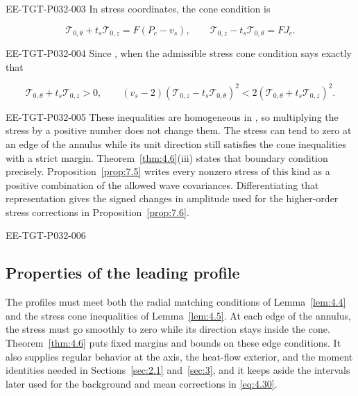 \begin{EESegment}{EE-TGT-P032-003}
In stress coordinates, the cone condition is
\end{EESegment}
\begin{equation}
  \mathcal{T}_{0,\theta}+t_s\mathcal{T}_{0,z}=F(P_c-v_s),\qquad
  \mathcal{T}_{0,z}-t_s\mathcal{T}_{0,\theta}=FJ_c.
  \tag{4.23}\label{eq:4.23}
\end{equation}
\begin{EESegment}{EE-TGT-P032-004}
Since , when
 the admissible stress cone condition says exactly
that
\end{EESegment}
\[
  \mathcal{T}_{0,\theta}+t_s\mathcal{T}_{0,z}>0,
  \qquad
  (v_s-2)(\mathcal{T}_{0,z}-t_s\mathcal{T}_{0,\theta})^2
  <2(\mathcal{T}_{0,\theta}+t_s\mathcal{T}_{0,z})^2.
\]
\begin{EESegment}{EE-TGT-P032-005}
These inequalities are homogeneous in
, so multiplying the stress by a positive
number does not change them. The stress can tend to zero at an edge of the
annulus while its unit direction still satisfies the cone inequalities with
a strict margin. Theorem~\ref{thm:4.6}(iii) states that boundary condition
precisely. Proposition~\ref{prop:7.5} writes every nonzero stress of this
kind as a positive combination of the allowed wave covariances.
Differentiating that representation gives the signed changes in amplitude
used for the higher-order stress corrections in
Proposition~\ref{prop:7.6}.
\end{EESegment}

\begin{EESegment}{EE-TGT-P032-006}
\subsection{Properties of the leading profile}\label{sec:4.4}

The profiles  must meet both the radial matching
conditions of Lemma~\ref{lem:4.4} and the stress cone inequalities of
Lemma~\ref{lem:4.5}. At each edge of the annulus, the stress
 must go smoothly to zero while its direction
stays inside the cone. Theorem~\ref{thm:4.6} puts fixed margins and bounds on these
edge conditions. It also supplies regular behavior at the axis, the heat-flow exterior,
and the moment identities needed in Sections~\ref{sec:2.1} and~\ref{sec:3},
and it keeps aside the intervals later used for the background and mean
corrections in \eqref{eq:4.30}.
\end{EESegment}

